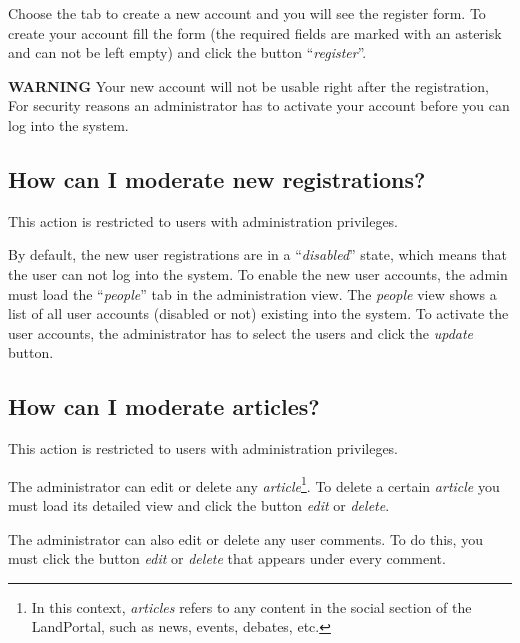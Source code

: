 Choose the tab to create a new account and you will see the register form.  To create your account fill the form (the required fields are marked with an asterisk and can not be left empty) and click the button ``\textit{register}''.

\textbf{WARNING}  Your new account will not be usable right after the registration, For security reasons an administrator has to activate your account before you can log into the system.

\subsection{How can I moderate new registrations?}
This action is restricted to users with administration privileges.

By default, the new user registrations are in a ``\textit{disabled}'' state, which means that the user can not log into the system.  To enable the new user accounts, the admin must load the ``\textit{people}'' tab in the administration view.  The \textit{people} view shows a list of all user accounts (disabled or not) existing into the system.  To activate the user accounts, the administrator has to select the users and click the \textit{update} button.

\subsection{How can I moderate articles?}
This action is restricted to users with administration privileges.

The administrator can edit or delete any \textit{article}\footnote{In this context, \textit{articles} refers to any content in the social section of the LandPortal, such as news, events, debates, etc.}.  To delete a certain \textit{article} you must load its detailed view and click the button \textit{edit} or \textit{delete}.

The administrator can also edit or delete any user comments.  To do this, you must click the button \textit{edit} or \textit{delete} that appears under every comment.